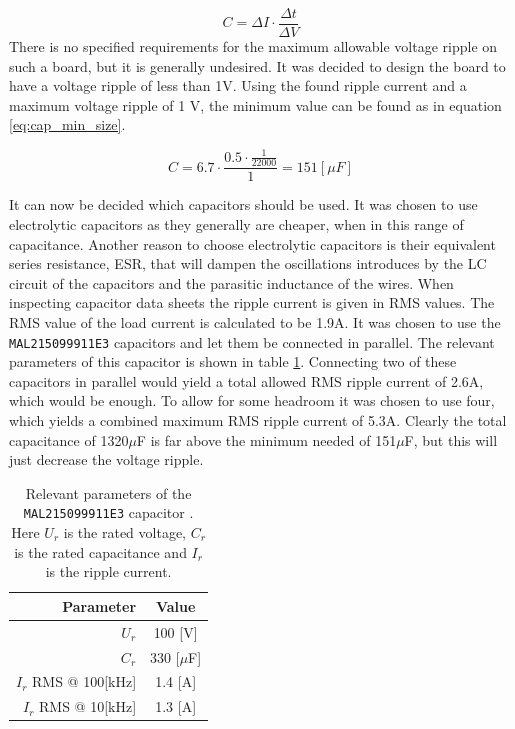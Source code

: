 \begin{equation} 
	C = \Delta I \cdot \frac{\Delta t}{\Delta V}
	\label{eq:cap_min}
\end{equation}
There is no specified requirements for the maximum allowable voltage ripple on such a board, but it is generally undesired.
It was decided to design the board to have a voltage ripple of less than 1V.
Using the found ripple current and a maximum voltage ripple of 1 V, the minimum value can be found as in equation \ref{eq:cap_min_size}.

\begin{equation} 
	C = 6.7 \cdot \frac{0.5 \cdot \frac{1}{22000}}{1 } = 151 [\mu F]
	\label{eq:cap_min_size}
\end{equation}

It can now be decided which capacitors should be used.
It was chosen to use electrolytic capacitors as they generally are cheaper, when in this range of capacitance. 
Another reason to choose electrolytic capacitors is their equivalent series resistance, ESR, that will dampen the oscillations introduces by the LC circuit of the capacitors and the parasitic inductance of the wires.
When inspecting capacitor data sheets the ripple current is given in RMS values. 
The RMS value of the load current is calculated to be 1.9A.
It was chosen to use the \texttt{MAL215099911E3} capacitors and let them be connected in parallel. 
The relevant parameters of this capacitor is shown in table \ref{tab:cap_parameters}.
Connecting two of these capacitors in parallel would yield a total allowed RMS ripple current of 2.6A, which would be enough.
To allow for some headroom it was chosen to use four, which yields a combined maximum RMS ripple current of 5.3A. 
Clearly the total capacitance of 1320$\mu$F is far above the minimum needed of 151$\mu$F, but this will just decrease the voltage ripple.

\begin{table}[tb]
	\centering
	\begin{tabular}{|r|c|}
	\hline
		\textbf{Parameter} & \textbf{Value} \\
	\hline
		$U_r$ & 100 [V]  \\ \hline
		$C_r$ & 330 [$\mu$F]  \\ \hline
		$I_r$ RMS @ 100[kHz] & 1.4 [A]  \\ \hline
		$I_r$ RMS @ 10[kHz] & 1.3 [A]  \\ \hline
		
	\end{tabular}
	\caption{Relevant parameters of the \texttt{MAL215099911E3} capacitor \cite{sup_cap}.
	Here $U_r$ is the rated voltage, $C_r$ is the rated capacitance and $I_r$ is the ripple current.}
	\label{tab:cap_parameters}
\end{table}

